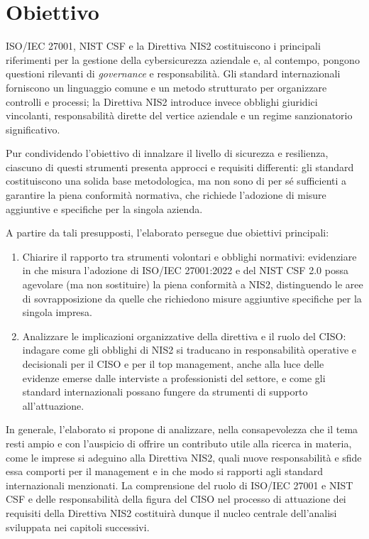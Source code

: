 \section{Obiettivo}
ISO/IEC 27001, NIST CSF e la Direttiva NIS2 costituiscono i principali riferimenti per la gestione della cybersicurezza aziendale e, 
al contempo, pongono questioni rilevanti di \textit{governance} e responsabilità. Gli standard internazionali forniscono un linguaggio 
comune e un metodo strutturato per organizzare controlli e processi; la Direttiva NIS2 introduce invece obblighi giuridici vincolanti, 
responsabilità dirette del vertice aziendale e un regime sanzionatorio significativo. 

Pur condividendo l’obiettivo di innalzare il livello di sicurezza e resilienza, ciascuno di questi strumenti
presenta approcci e requisiti differenti: gli standard costituiscono una solida base metodologica, ma non
sono di per sé sufficienti a garantire la piena conformità normativa, che richiede l’adozione di misure
aggiuntive e specifiche per la singola azienda.

A partire da tali presupposti, l’elaborato persegue due obiettivi principali:
\begin{enumerate}
  \item Chiarire il rapporto tra strumenti volontari e obblighi normativi: evidenziare in che misura l’adozione di ISO/IEC 27001:2022 e del 
    NIST CSF 2.0 possa agevolare (ma non sostituire) la piena conformità a NIS2, distinguendo le aree di sovrapposizione da quelle che 
    richiedono misure aggiuntive specifiche per la singola impresa.
  \item Analizzare le implicazioni organizzative della direttiva e il ruolo del CISO: indagare come gli obblighi di NIS2 si traducano in responsabilità 
    operative e decisionali per il CISO e per il top management, anche alla luce delle evidenze emerse dalle interviste a professionisti del settore, 
    e come gli standard internazionali possano fungere da strumenti di supporto all’attuazione.
\end{enumerate}

In generale, l'elaborato si propone di analizzare, nella consapevolezza che il tema resti ampio e con l'auspicio
di offrire un contributo utile alla ricerca in materia, come le imprese si adeguino alla Direttiva NIS2, quali nuove
responsabilità e sfide essa comporti per il management e in che modo si rapporti agli standard internazionali menzionati.
La comprensione del ruolo di ISO/IEC 27001 e NIST CSF e delle responsabilità della figura del CISO nel processo di attuazione dei requisiti della 
Direttiva NIS2 costituirà dunque il nucleo centrale dell’analisi sviluppata nei capitoli successivi.




